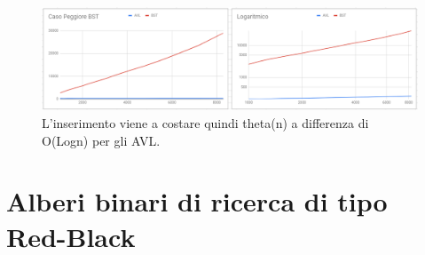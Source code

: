 \documentclass[a4paper]{article}
\begin{document}
			\begin{figure}[ht]
				\includegraphics[width=15cm]{CasoPeggioreBST}
				\caption{L'inserimento viene a costare quindi theta(n) a differenza di O(Logn) per gli AVL.}
			\end{figure}
			
		\newpage
		
		\section{Alberi binari di ricerca di tipo Red-Black}
\end{document}
